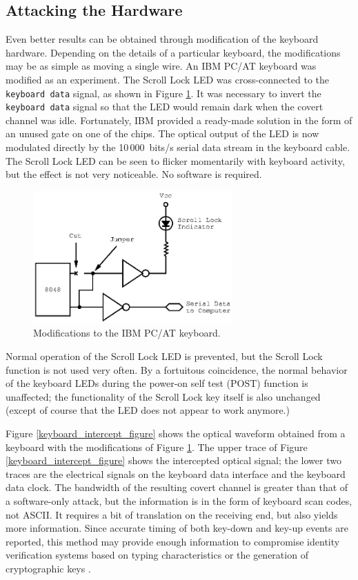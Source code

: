 \documentclass{acmtrans2e}
\begin{document}
\subsection{Attacking the Hardware}

Even better results can be obtained through modification of the keyboard 
hardware.  Depending on the details of a particular keyboard, the 
modifications may be as simple as moving a single wire.  An IBM PC/AT 
keyboard was modified as an experiment.  The Scroll Lock LED was
cross-connected to the {\tt keyboard data} signal, as shown in Figure 
\ref{keyboard_cross_connect_figure}.  It was necessary to invert the {\tt
keyboard data} signal so that the LED would remain dark when the covert 
channel was idle.  Fortunately, IBM provided a ready-made 
solution in the form of an unused gate on one of the chips.  The optical 
output of the LED is now modulated directly by the 10\,000~bits/s
serial data stream in the keyboard cable.  The Scroll Lock LED can be 
seen to flicker momentarily with keyboard activity, but the effect is
not very noticeable.  No software is required.

\begin{figure}
\centering
\includegraphics[height=2in]{Figure_10.eps}
\caption{Modifications to the IBM PC/AT keyboard.}
\label{keyboard_cross_connect_figure}
\end{figure}

Normal operation of the Scroll Lock LED is prevented, but the Scroll Lock
function is not used very often.  By a fortuitous coincidence, the normal 
behavior of the keyboard LEDs during the power-on self test (POST)
function is unaffected; the functionality of the Scroll Lock key itself
is also unchanged (except of course that the LED does not appear to work
anymore.)

Figure \ref{keyboard_intercept_figure} shows the optical waveform 
obtained from a keyboard with the modifications of Figure 
\ref{keyboard_cross_connect_figure}.  The upper trace of
Figure \ref{keyboard_intercept_figure} shows the
intercepted optical signal; the lower two traces are the electrical
signals on the keyboard data interface and the keyboard data clock.
The bandwidth of the resulting 
covert channel is greater than that of a software-only attack, but the 
information is in the form of keyboard scan codes, not ASCII.  It 
requires a bit of translation on the receiving end, but also yields more 
information.  Since accurate timing of both key-down and key-up events 
are reported, this method may provide enough information to compromise 
identity verification systems based on typing characteristics
\cite{umphress_and_williams} or the
generation of cryptographic keys \cite{pgp}.
\end{document}
